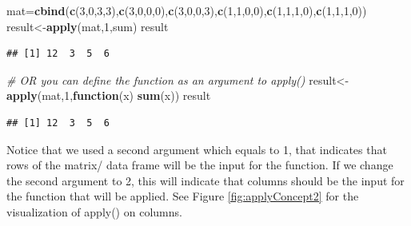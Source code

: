 \documentclass[12pt,]{krantz}
\newenvironment{Shaded}{\begin{snugshade}}{\end{snugshade}}
\newcommand{\CommentTok}[1]{\textcolor[rgb]{0.56,0.35,0.01}{\textit{#1}}}
\newcommand{\ControlFlowTok}[1]{\textcolor[rgb]{0.13,0.29,0.53}{\textbf{#1}}}
\newcommand{\DecValTok}[1]{\textcolor[rgb]{0.00,0.00,0.81}{#1}}
\newcommand{\KeywordTok}[1]{\textcolor[rgb]{0.13,0.29,0.53}{\textbf{#1}}}
\newcommand{\NormalTok}[1]{#1}
\theoremstyle{definition}
\theoremstyle{definition}
\theoremstyle{definition}
\theoremstyle{remark}
\begin{document}
\begin{Shaded}
\begin{Highlighting}[]
\NormalTok{mat=}\KeywordTok{cbind}\NormalTok{(}\KeywordTok{c}\NormalTok{(}\DecValTok{3}\NormalTok{,}\DecValTok{0}\NormalTok{,}\DecValTok{3}\NormalTok{,}\DecValTok{3}\NormalTok{),}\KeywordTok{c}\NormalTok{(}\DecValTok{3}\NormalTok{,}\DecValTok{0}\NormalTok{,}\DecValTok{0}\NormalTok{,}\DecValTok{0}\NormalTok{),}\KeywordTok{c}\NormalTok{(}\DecValTok{3}\NormalTok{,}\DecValTok{0}\NormalTok{,}\DecValTok{0}\NormalTok{,}\DecValTok{3}\NormalTok{),}\KeywordTok{c}\NormalTok{(}\DecValTok{1}\NormalTok{,}\DecValTok{1}\NormalTok{,}\DecValTok{0}\NormalTok{,}\DecValTok{0}\NormalTok{),}\KeywordTok{c}\NormalTok{(}\DecValTok{1}\NormalTok{,}\DecValTok{1}\NormalTok{,}\DecValTok{1}\NormalTok{,}\DecValTok{0}\NormalTok{),}\KeywordTok{c}\NormalTok{(}\DecValTok{1}\NormalTok{,}\DecValTok{1}\NormalTok{,}\DecValTok{1}\NormalTok{,}\DecValTok{0}\NormalTok{))}
\NormalTok{result<-}\KeywordTok{apply}\NormalTok{(mat,}\DecValTok{1}\NormalTok{,sum)}
\NormalTok{result}
\end{Highlighting}
\end{Shaded}

\begin{verbatim}
## [1] 12  3  5  6
\end{verbatim}

\begin{Shaded}
\begin{Highlighting}[]
\CommentTok{# OR you can define the function as an argument to apply()}
\NormalTok{result<-}\KeywordTok{apply}\NormalTok{(mat,}\DecValTok{1}\NormalTok{,}\ControlFlowTok{function}\NormalTok{(x) }\KeywordTok{sum}\NormalTok{(x))}
\NormalTok{result}
\end{Highlighting}
\end{Shaded}

\begin{verbatim}
## [1] 12  3  5  6
\end{verbatim}

Notice that we used a second argument which equals to 1, that indicates
that rows of the matrix/ data frame will be the input for the function.
If we change the second argument to 2, this will indicate that columns
should be the input for the function that will be applied. See Figure
\ref{fig:applyConcept2} for the visualization of apply() on columns.
\end{document}
